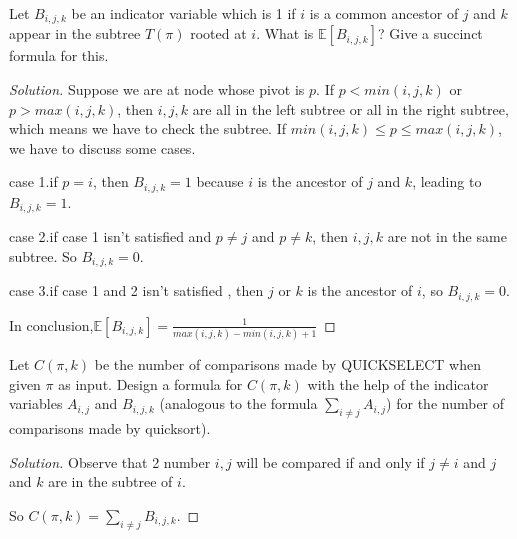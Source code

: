 


\maketitle

\begin{thm}{}{}
    Let $B_{i,j,k}$ be an indicator variable which is 1 if $i$ is a common ancestor of  $j$ and $k$ appear in the subtree $T(\pi)$ rooted at $i$.
    What is $\mathbb{E}[B_{i,j,k}]$? Give a succinct formula for this.
\end{thm}

\begin{proof}[Solution]
  	Suppose we are at node whose pivot is $p$. If $p< min(i,j,k)$ or $p>max(i,j,k)$, then $i,j,k$ are all in the left subtree or all in the right subtree, which means we have to check the subtree.
  	If $min(i,j,k)\le p \le max(i,j,k)$, we have to discuss some cases.
  	
  	case 1.if $p=i$, then $B_{i,j,k}=1$ because $i$ is the ancestor of $j$ and $k$, leading to $B_{i,j,k}=1$.
  	
  	case 2.if case 1 isn't satisfied and $p\ne j$ and $p\ne k$, then $i,j,k$ are not in the same subtree. So $B_{i,j,k}=0$.
  	
  	case 3.if case 1 and 2 isn't satisfied , then $j$ or $k$ is the ancestor of $i$, so $B_{i,j,k}=0$.
  	
  	In conclusion,$\mathbb{E}[B_{i,j,k}]=\frac{1}{max(i,j,k)-min(i,j,k)+1}$
\end{proof}



\begin{thm}
	Let $C(\pi,k)$ be the number of comparisons made by QUICKSELECT	when given $\pi$ as input. Design a formula for $C(\pi,k)$ with the help of the indicator variables $A_{i,j}$ and $B_{i,j,k}$ (analogous to the formula $\sum_{i\ne j}A_{i,j}$) for the number of comparisons made by quicksort).
	
\end{thm}

\begin{proof}[Solution]
	Observe that 2 number $i,j$ will be compared if and only if $j\ne i$ and $j$ and $k$ are in the subtree of $i$.
	
	So $C(\pi,k)=\sum_{i\ne j}B_{i,j,k}$.
\end{proof}





